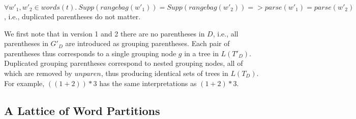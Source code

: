 \documentclass[acmsmall,review,anonymous]{acmart}\settopmatter{printfolios=true,printccs=false,printacmref=false}
\newcommand{\support}{\mathit{Supp}}
\newcommand{\semantic}{\mathit{unparen}} %
\newcommand{\parse}{\mathit{parse}} %
\newcommand{\words}{\mathit{words}} %
\newcommand{\alt}{\mathit{alt}} %
\newcommand{\rangebag}{\mathit{rangebag}} %
\begin{document}
\begin{lemma}
  $\forall w'_1, w'_2 \in \words(t).\ \support(\rangebag(w'_1)) = \support(\rangebag(w'_2)) => \parse(w'_1) = \parse(w'_2)$, i.e., duplicated parentheses do not matter.
  \label{lemma:rangeset-equality}
\end{lemma}
\noindent We first note that in version 1 and 2 there are no parentheses in $D$, i.e., all parentheses in $G'_D$ are introduced as grouping parentheses. Each pair of parentheses thus corresponds to a single grouping node $g$ in a tree in $L(T'_D)$. Duplicated grouping parentheses correspond to nested grouping nodes, all of which are removed by $\semantic$, thus producing identical sets of trees in $L(T_D)$. For example, $((1 + 2)) * 3$ has the same interpretations as $(1 + 2) * 3$.

\subsection{A Lattice of Word Partitions} \label{sec:lattice}
\end{document}
